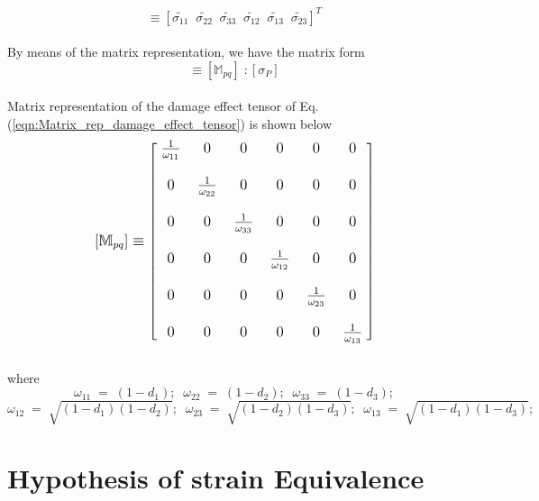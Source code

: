 \documentclass[12pt,a4paper,twoside,openright]{report}
\begin{document}
\begin{equation}
   [\tilde{\sigma_{P}}]  \equiv  [\tilde{\sigma_{11}} \;\; \tilde{\sigma_{22}} \;\;\tilde{\sigma_{33}} \;\;\tilde{\sigma_{12}} \;\;\tilde{\sigma_{13}} \;\;\tilde{\sigma_{23}} ]^{T}
\end{equation}
\\
By means of the matrix representation, we have the matrix form
\begin{equation}
[\tilde{\sigma_{P}}] \equiv [\mathbb{M}_{pq}]\;: [\sigma_{P}]
\label{eqn:Matrix_rep_damage_effect_tensor}
\end{equation}
\\
Matrix representation of the damage effect tensor of Eq.(\ref{eqn:Matrix_rep_damage_effect_tensor}) is shown below \citep{wang2009three}
\\
$$
\mathlarger{ [\mathbb{M}_{pq}] \equiv   
 \begin{bmatrix}
   \; \frac{1}{\omega_{11}}  \; & 0 \; & 0 \; & 0 \; & 0\; & 0  \;\\
  \\
   \;0\; & \frac{1}{\omega_{22}}\; & 0\; & 0\; & 0\; & 0  \;\\
  \\
  \; 0\; & 0 \; & \frac{1}{\omega_{33}}\; & 0\; & 0\; & 0 \; \\
  \\
   \; 0\; & 0\; & 0\; & \frac{1}{\omega_{12}}\; & 0\; & 0  \;\\
  \\
   \; 0\; & 0\; & 0\; & 0\; & \frac{1}{\omega_{23}}\; & 0  \;\\
  \\
   \; 0\; & 0\; & 0\; & 0\; & 0\; & \frac{1}{\omega_{13}}  \; 
  \\
 \end{bmatrix}}
 \label{Damage_effect_tensor}
 $$
\\
where
$$\omega_{11} \; = \; (1 - d_{1}); \;\;  \omega_{22} \; = \; (1 - d_{2}); \;\; \omega_{33} \; = \; (1 - d_{3});$$ \vspace*{0.1cm} $$\omega_{12} \; = \; \sqrt{(1 - d_{1})(1 - d_{2})};  \;\;\omega_{23} \; = \; \sqrt{(1 - d_{2})(1 - d_{3})}; \;\; \omega_{13} \; = \; \sqrt{(1 - d_{1})(1 - d_{3})};$$

\section{Hypothesis of strain Equivalence}\label{Hypothesis of Strain Equivalence}
\end{document}
